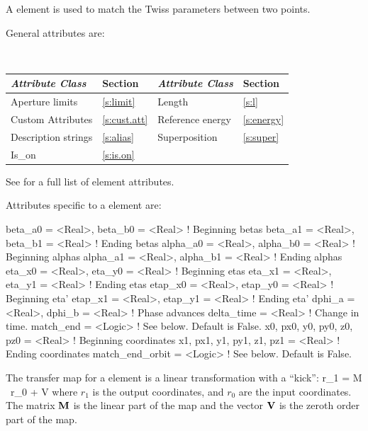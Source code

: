 {A  element is used to match the Twiss parameters between two
points. 

General  attributes are:
\begin{center} 
\tt
\begin{tabular}{llll} \toprule
  {\sl Attribute Class}      & Section           & {\sl Attribute Class}      & Section         \\ \midrule
  Aperture limits            & \ref{s:limit}     & Length                     & \ref{s:l}       \\
  Custom Attributes          & \ref{s:cust.att}  & Reference energy           & \ref{s:energy}  \\ 
  Description strings        & \ref{s:alias}     & Superposition              & \ref{s:super}   \\ 
  Is_on                      & \ref{s:is.on}     &                            &                 \\
  \bottomrule
\end{tabular}
\end{center}
\toffset
See  for a full list of element attributes.

Attributes specific to a  element are:
\begin{example}
  beta_a0     = <Real>,  beta_b0  = <Real>   ! Beginning betas
  beta_a1     = <Real>,  beta_b1  = <Real>   ! Ending betas
  alpha_a0    = <Real>,  alpha_b0 = <Real>   ! Beginning alphas
  alpha_a1    = <Real>,  alpha_b1 = <Real>   ! Ending alphas
  eta_x0      = <Real>,  eta_y0   = <Real>   ! Beginning etas 
  eta_x1      = <Real>,  eta_y1   = <Real>   ! Ending etas 
  etap_x0     = <Real>,  etap_y0  = <Real>   ! Beginning eta' 
  etap_x1     = <Real>,  etap_y1  = <Real>   ! Ending eta'
  dphi_a      = <Real>,  dphi_b   = <Real>   ! Phase advances
  delta_time  = <Real>                       ! Change in time.
  match_end = <Logic>                      ! See below. Default is False.
  x0, px0, y0, py0, z0, pz0 = <Real>       ! Beginning coordinates
  x1, px1, y1, py1, z1, pz1 = <Real>       ! Ending coordinates
  match_end_orbit = <Logic>                ! See below. Default is False.
\end{example}

The transfer map for a  element is a linear transformation 
with a ``kick'':
\Begineq
  r_1 = \Bf M \, r_0 + \Bf V 
\Endeq
where $r_1$ is the output coordinates, and $r_0$ are the input
coordinates. The matrix ${\bf M}$ is the linear part of the map and the
vector ${\bf V}$ is the zeroth order part of the map.

}
